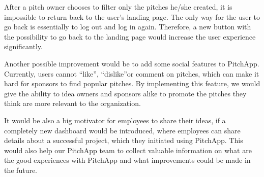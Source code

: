 After a pitch owner chooses to filter only the pitches he/she created, it is impossible to return back to the user’s landing page. The only way for the user to go back is essentially to log out and log in again. Therefore, a new button with the possibility to go back to the landing page would increase the user experience significantly.

Another possible improvement would be to add some social features to PitchApp. Currently, users cannot “like”, “dislike”or comment on pitches, which can make it hard for sponsors to find popular pitches. By implementing this feature, we would give the ability to idea owners and sponsors alike to promote the pitches they think are more relevant to the organization.

It would be also a big motivator for employees to share their ideas, if a completely new dashboard would be introduced, where employees can share details about a successful project, which they initiated using PitchApp. This would also help our PitchApp team to collect valuable information on what are the good experiences with PitchApp and what improvements could be made in the future.




